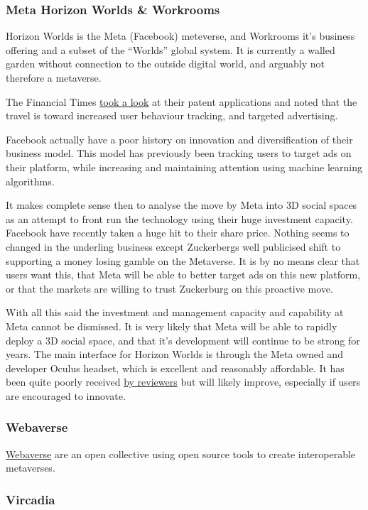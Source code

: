 \subsubsection{Meta Horizon Worlds \& Workrooms}
Horizon Worlds is the Meta (Facebook) meteverse, and Workrooms it's business offering and a subset of the ``Worlds'' global system. It is currently a walled garden without connection to the outside digital world, and arguably not therefore a metaverse.\par
The Financial Times \href{}{took a look} at their patent applications and noted that the travel is toward increased user behaviour tracking, and targeted advertising.\par
Facebook actually have a poor history on innovation and diversification of their business model. This model has previously been tracking users to target ads on their platform, while increasing and maintaining attention using machine learning algorithms. \par
It makes complete sense then to analyse the move by Meta into 3D social spaces as an attempt to front run the technology using their huge investment capacity. Facebook have recently taken a huge hit to their share price. Nothing seems to changed in the underling business except Zuckerbergs well publicised shift to supporting a money losing gamble on the Metaverse. It is by no means clear that users want this, that Meta will be able to better target ads on this new platform, or that the markets are willing to trust Zuckerburg on this proactive move. \par
With all this said the investment and management capacity and capability at Meta cannot be dismissed. It is very likely that Meta will be able to rapidly deploy a 3D social space, and that it's development will continue to be strong for years. The main interface for Horizon Worlds is through the Meta owned and developer Oculus headset, which is excellent and reasonably affordable. It has been quite poorly received \href{https://kotaku.com/facebook-metaverse-horizon-worlds-vr-oculus-quest-2-cha-1848436740}{by reviewers} but will likely improve, especially if users are encouraged to innovate.
\subsubsection{Webaverse}
\href{https://webaverse.com/}{Webaverse} are an open collective using open source tools to create interoperable metaverses.
\subsubsection{Vircadia}

